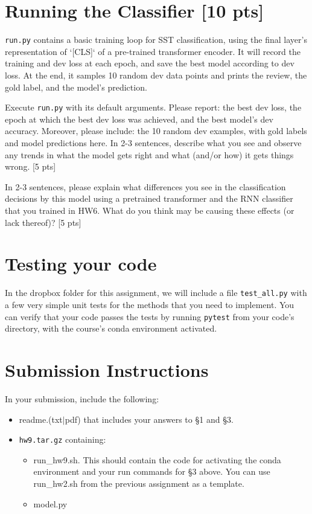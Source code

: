 \documentclass[11pt]{article}
\begin{document}
\section{Running the Classifier [10 pts]}

\texttt{run.py} contains a basic training loop for SST classification, using the final layer's representation of `[CLS]` of a pre-trained transformer encoder. It will record the training and dev loss at each epoch, and save the best model according to dev loss.  At the end, it samples 10 random dev data points and prints the review, the gold label, and the model's prediction.

\vspace{2em}
 Execute \texttt{run.py} with its default arguments.  Please report: the best dev loss, the epoch at which the best dev loss was achieved, and the best model's dev accuracy.  Moreover, please include: the 10 random dev examples, with gold labels and model predictions here.  In 2-3 sentences, describe what you see and observe any trends in what the model gets right and what (and/or how) it gets things wrong. \hfill [5 pts]

\vspace{2em}
 In 2-3 sentences, please explain what differences you see in the classification decisions by this model using a pretrained transformer and the RNN classifier that you trained in HW6. What do you think may be causing these effects (or lack thereof)? \hfill [5 pts]


\section{Testing your code}

In the dropbox folder for this assignment, we will include a file \texttt{test\_all.py} with a few very simple unit tests for the methods that you need to implement.  You can verify that your code passes the tests by running \texttt{pytest} from your code's directory, with the course's conda environment activated.


\section*{Submission Instructions}

In your submission, include the following:
\begin{itemize}
  \item readme.(txt$\mid$pdf) that includes your answers to \S1 and \S3. 
  \item \texttt{hw9.tar.gz} containing:
  \begin{itemize}
    \item run\_hw9.sh.  This should contain the code for activating the conda environment and your run commands for \S3 above.  You can use run\_hw2.sh from the previous assignment as a template.
    \item model.py
  \end{itemize}
\end{itemize}
\end{document}
